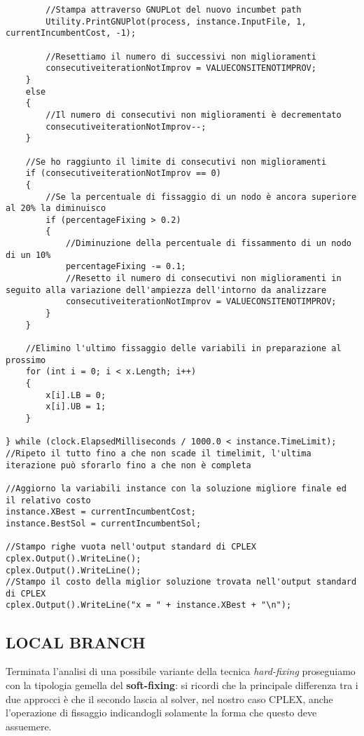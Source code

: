\documentclass[11pt]{article}
\begin{document}
\begin{lstlisting}
        //Stampa attraverso GNUPLot del nuovo incumbet path
        Utility.PrintGNUPlot(process, instance.InputFile, 1, currentIncumbentCost, -1);

        //Resettiamo il numero di successivi non miglioramenti
        consecutiveiterationNotImprov = VALUECONSITENOTIMPROV;
    }
    else
    {
        //Il numero di consecutivi non miglioramenti è decrementato
        consecutiveiterationNotImprov--;
    }

    //Se ho raggiunto il limite di consecutivi non miglioramenti
    if (consecutiveiterationNotImprov == 0)
    {
        //Se la percentuale di fissaggio di un nodo è ancora superiore al 20% la diminuisco
        if (percentageFixing > 0.2)
        {
            //Diminuzione della percentuale di fissammento di un nodo di un 10%
            percentageFixing -= 0.1;
            //Resetto il numero di consecutivi non miglioramenti in seguito alla variazione dell'ampiezza dell'intorno da analizzare
            consecutiveiterationNotImprov = VALUECONSITENOTIMPROV;
        }
    }

    //Elimino l'ultimo fissaggio delle variabili in preparazione al prossimo 
    for (int i = 0; i < x.Length; i++)
    {
        x[i].LB = 0;
        x[i].UB = 1;
    }

} while (clock.ElapsedMilliseconds / 1000.0 < instance.TimeLimit);
//Ripeto il tutto fino a che non scade il timelimit, l'ultima iterazione può sforarlo fino a che non è completa

//Aggiorno la variabili instance con la soluzione migliore finale ed il relativo costo
instance.XBest = currentIncumbentCost;
instance.BestSol = currentIncumbentSol;

//Stampo righe vuota nell'output standard di CPLEX
cplex.Output().WriteLine();
cplex.Output().WriteLine();
//Stampo il costo della miglior soluzione trovata nell'output standard di CPLEX
cplex.Output().WriteLine("x = " + instance.XBest + "\n");
\end{lstlisting}

\subsection*{LOCAL BRANCH}
\label{sec:LocalBranchS}

Terminata l'analisi di una possibile variante della tecnica \textit{hard-fixing} proseguiamo con la tipologia gemella del \textbf{soft-fixing}: si ricordi che la principale differenza tra i due approcci è che il secondo lascia al solver, nel nostro caso CPLEX, anche l'operazione di fissaggio indicandogli solamente la forma che questo deve assuemere.
\end{document}
